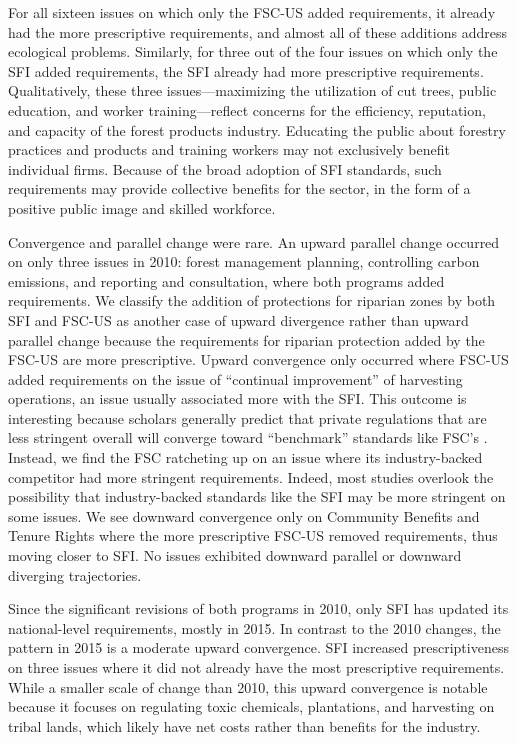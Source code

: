 \documentclass[
      12pt,
            Review ]{article}
\begin{document}
For all sixteen issues on which only the FSC-US added requirements, it
already had the more prescriptive requirements, and almost all of these
additions address ecological problems. Similarly, for three out of the
four issues on which only the SFI added requirements, the SFI already
had more prescriptive requirements. Qualitatively, these three
issues---maximizing the utilization of cut trees, public education, and
worker training---reflect concerns for the efficiency, reputation, and
capacity of the forest products industry. Educating the public about
forestry practices and products and training workers may not exclusively
benefit individual firms. Because of the broad adoption of SFI
standards, such requirements may provide collective benefits for the
sector, in the form of a positive public image and skilled workforce.



Convergence and parallel change were rare. An upward parallel change
occurred on only three issues in 2010: forest management planning,
controlling carbon emissions, and reporting and consultation, where both
programs added requirements. We classify the addition of protections for
riparian zones by both SFI and FSC-US as another case of upward
divergence rather than upward parallel change because the requirements
for riparian protection added by the FSC-US are more prescriptive.
Upward convergence only occurred where FSC-US added requirements on the
issue of ``continual improvement'' of harvesting operations, an issue
usually associated more with the SFI. This outcome is interesting
because scholars generally predict that private regulations that are
less stringent overall will converge toward ``benchmark'' standards like
FSC's \citep{Overdevest2005, Overdevest2010}. Instead, we find the FSC
ratcheting up on an issue where its industry-backed competitor had more
stringent requirements. Indeed, most studies overlook the possibility
that industry-backed standards like the SFI may be more stringent on
some issues. We see downward convergence only on Community Benefits and
Tenure Rights where the more prescriptive FSC-US removed requirements,
thus moving closer to SFI. No issues exhibited downward parallel or
downward diverging trajectories.

Since the significant revisions of both programs in 2010, only SFI has
updated its national-level requirements, mostly in 2015. In contrast to
the 2010 changes, the pattern in 2015 is a moderate upward convergence.
SFI increased prescriptiveness on three issues where it did not already
have the most prescriptive requirements. While a smaller scale of change
than 2010, this upward convergence is notable because it focuses on
regulating toxic chemicals, plantations, and harvesting on tribal lands,
which likely have net costs rather than benefits for the industry.
\end{document}
